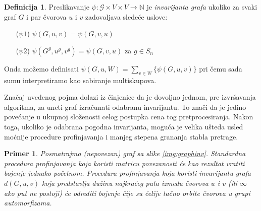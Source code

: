 \documentclass[12pt,oneside]{memoir}
\newtheorem{example}{Primer}
\theoremstyle{definition}
\newtheorem*{definition}{Definicija}
\begin{document}
  \begin{definition}
	  Preslikavanje $\psi : \mathcal{G} \times V \times V \to \mathbb{N}$ je
	  \emph{invarijanta grafa} ukoliko za svaki graf $G$ i par čvorova $u$ i $v$
	  zadovoljava sledeće uslove:

	  \begin{itemize}
		  \item[($\psi1$)] $\psi(G, u, v) = \psi(G, v, u)$
		  \item[($\psi2$)] $\psi(G^g, u^g, v^g) = \psi(G, v, u)$ za $g \in S_n$
	  \end{itemize}
  \end{definition}

  Onda možemo definisati $\psi(G, u, W) = \sum_{v \in W} \{\psi(G, u, v)\}$ pri
  čemu sada sumu interpretiramo kao sabiranje multiskupova.

  Značaj uvedenog pojma dolazi iz činjenice da je dovoljno jednom, pre
  izvršavanja algoritma, za uneti graf izračunati odabranu invarijantu. To
  znači da je jedino povećanje u ukupnoj složenosti celog postupka cena tog
  pretprocesiranja. Nakon toga, ukoliko je odabrana pogodna invarijanta, moguća
  je velika ušteda usled moćnije procedure profinjavanja i manjeg stepena
  grananja stabla pretrage.

  \begin{example}
	  Posmatrajmo (nepovezan) graf sa slike \ref{img:graphinv}. Standardna
	  procedura profinjavanja koja koristi matricu povezanosti će kao rezultat
	  vratiti bojenje jednako početnom. Procedura profinjavanja koja koristi
	  invarijantu grafa $d(G, u, v)$ koja predstavlja dužinu najkraćeg puta
	  između čvorova $u$ i $v$ (ili $\infty$ ako put ne postoji) će odrediti
	  bojenje čije su ćelije tačno orbite čvorova u grupi automorfizama.
  \end{example}
\end{document}
